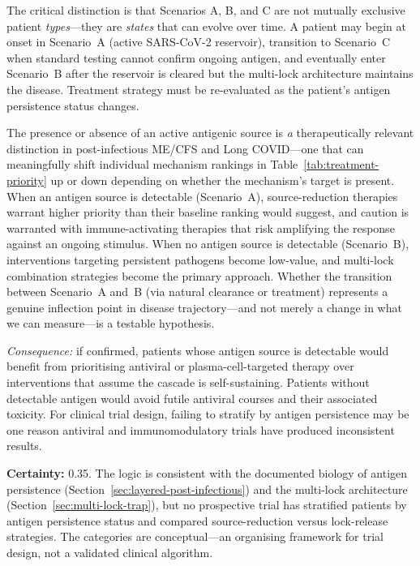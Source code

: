 The critical distinction is that Scenarios A, B, and C are not mutually exclusive patient \emph{types}---they are \emph{states} that can evolve over time. A patient may begin at onset in Scenario~A (active SARS-CoV-2 reservoir), transition to Scenario~C when standard testing cannot confirm ongoing antigen, and eventually enter Scenario~B after the reservoir is cleared but the multi-lock architecture maintains the disease. Treatment strategy must be re-evaluated as the patient's antigen persistence status changes.

\begin{hypothesis}
\label{hyp:antigen-stratification}
The presence or absence of an active antigenic source is \emph{a} therapeutically relevant distinction in post-infectious ME/CFS and Long COVID---one that can meaningfully shift individual mechanism rankings in Table~\ref{tab:treatment-priority} up or down depending on whether the mechanism's target is present. When an antigen source is detectable (Scenario~A), source-reduction therapies warrant higher priority than their baseline ranking would suggest, and caution is warranted with immune-activating therapies that risk amplifying the response against an ongoing stimulus. When no antigen source is detectable (Scenario~B), interventions targeting persistent pathogens become low-value, and multi-lock combination strategies become the primary approach. Whether the transition between Scenario~A and~B (via natural clearance or treatment) represents a genuine inflection point in disease trajectory---and not merely a change in what we can measure---is a testable hypothesis.

\textit{Consequence:} if confirmed, patients whose antigen source is detectable would benefit from prioritising antiviral or plasma-cell-targeted therapy over interventions that assume the cascade is self-sustaining. Patients without detectable antigen would avoid futile antiviral courses and their associated toxicity. For clinical trial design, failing to stratify by antigen persistence may be one reason antiviral and immunomodulatory trials have produced inconsistent results.

\textbf{Certainty:} 0.35. The logic is consistent with the documented biology of antigen persistence (Section~\ref{sec:layered-post-infectious}) and the multi-lock architecture (Section~\ref{sec:multi-lock-trap}), but no prospective trial has stratified patients by antigen persistence status and compared source-reduction versus lock-release strategies. The categories are conceptual---an organising framework for trial design, not a validated clinical algorithm.


\end{hypothesis}
